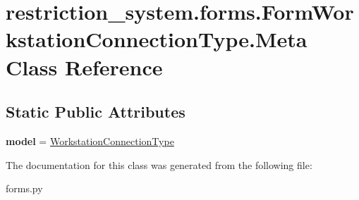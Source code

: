 \hypertarget{classrestriction__system_1_1forms_1_1FormWorkstationConnectionType_1_1Meta}{}\section{restriction\+\_\+system.\+forms.\+Form\+Workstation\+Connection\+Type.\+Meta Class Reference}
\label{classrestriction__system_1_1forms_1_1FormWorkstationConnectionType_1_1Meta}
\subsection*{Static Public Attributes}
\begin{DoxyCompactItemize}
\item 
\hypertarget{classrestriction__system_1_1forms_1_1FormWorkstationConnectionType_1_1Meta_a70cdc99e590cc498bcb6f8a8e6949a7a}{}{\bfseries model} = \hyperlink{classrestriction__system_1_1models_1_1WorkstationConnectionType}{Workstation\+Connection\+Type}\label{classrestriction__system_1_1forms_1_1FormWorkstationConnectionType_1_1Meta_a70cdc99e590cc498bcb6f8a8e6949a7a}

\end{DoxyCompactItemize}


The documentation for this class was generated from the following file\+:\begin{DoxyCompactItemize}
\item 
forms.\+py\end{DoxyCompactItemize}
